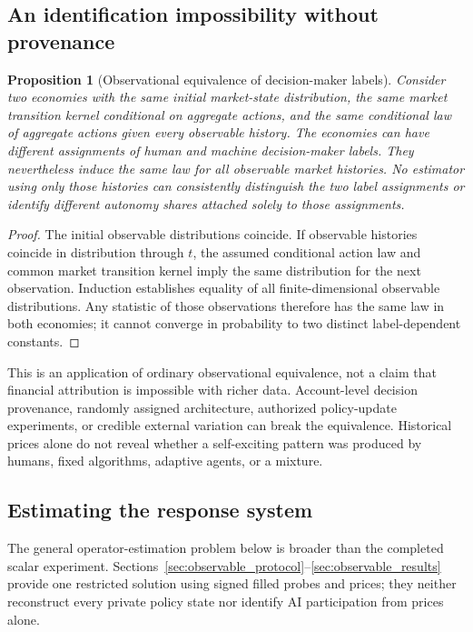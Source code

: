 \documentclass[11pt,a4paper]{article}
\newtheorem{proposition}[theorem]{Proposition}
\theoremstyle{definition}
\theoremstyle{remark}
\begin{document}
\subsection{An identification impossibility without provenance}
\begin{proposition}[Observational equivalence of decision-maker labels]
\label{prop:identification}
Consider two economies with the same initial market-state distribution, the same market transition kernel conditional on aggregate actions, and the same conditional law of aggregate actions given every observable history. The economies can have different assignments of human and machine decision-maker labels. They nevertheless induce the same law for all observable market histories. No estimator using only those histories can consistently distinguish the two label assignments or identify different autonomy shares attached solely to those assignments.
\end{proposition}
\begin{proof}
The initial observable distributions coincide. If observable histories coincide in distribution through $t$, the assumed conditional action law and common market transition kernel imply the same distribution for the next observation. Induction establishes equality of all finite-dimensional observable distributions. Any statistic of those observations therefore has the same law in both economies; it cannot converge in probability to two distinct label-dependent constants.
\end{proof}
This is an application of ordinary observational equivalence, not a claim that financial attribution is impossible with richer data. Account-level decision provenance, randomly assigned architecture, authorized policy-update experiments, or credible external variation can break the equivalence. Historical prices alone do not reveal whether a self-exciting pattern was produced by humans, fixed algorithms, adaptive agents, or a mixture.

\subsection{Estimating the response system}
The general operator-estimation problem below is broader than the completed scalar experiment. Sections~\ref{sec:observable_protocol}--\ref{sec:observable_results} provide one restricted solution using signed filled probes and prices; they neither reconstruct every private policy state nor identify AI participation from prices alone.
\end{document}
